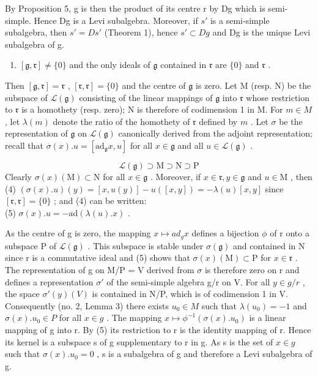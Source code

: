 By Proposition 5, g is then the product of its centre r by Dg which is semi-simple. Hence Dg is a Levi subalgebra. Moreover, if \(s'\) is a semi-simple subalgebra, then \(s' = Ds'\) (Theorem 1), hence \(s' \subset Dg\) and Dg is the unique Levi subalgebra of g.

\begin{enumerate}
\def\labelenumi{(\alph{enumi})}
\setcounter{enumi}{1}
\tightlist
\item
  \([\mathfrak{g},\mathfrak{r}]\neq \{0\}\) and the only ideals of \(\mathfrak{g}\) contained in \(\mathfrak{r}\) are \(\{0\}\) and \(\mathfrak{r}\) .
\end{enumerate}

Then \([\mathfrak{g},\mathfrak{r}] = \mathfrak{r}\) , \([\mathfrak{r},\mathfrak{r}] = \{0\}\) and the centre of \(\mathfrak{g}\) is zero. Let M (resp. N) be the subspace of \(\mathcal{L}(\mathfrak{g})\) consisting of the linear mappings of \(\mathfrak{g}\) into \(\mathfrak{r}\) whose restriction to \(\mathfrak{r}\) is a homothety (resp. zero); N is therefore of codimension 1 in M. For \(m\in M\) , let \(\lambda (m)\) denote the ratio of the homothety of \(\mathfrak{r}\) defined by \(m\) . Let \(\sigma\) be the representation of \(\mathfrak{g}\) on \(\mathcal{L}(\mathfrak{g})\) canonically derived from the adjoint representation; recall that \(\sigma (x).u = [\mathrm{ad}_{\mathfrak{g}}x,u]\) for all \(x\in \mathfrak{g}\) and all \(u\in \mathcal{L}(\mathfrak{g})\) .

\[
\mathcal{L}(\mathfrak{g}) \supset \mathrm{M} \supset \mathrm{N} \supset \mathrm{P}
\]
Clearly \(\sigma (x)(\mathrm{M})\subset \mathrm{N}\) for all \(x\in \mathfrak{g}\) . Moreover, if \(x\in \mathfrak{r},y\in \mathfrak{g}\) and \(u\in \mathrm{M}\) , then\\
(4) \((\sigma (x).u)(y) = [x,u(y)] - u([x,y]) = -\lambda (u)[x,y]\) since \([\mathfrak{r},\mathfrak{r}] = \{0\}\) ; and (4) can be written:\\
(5) \(\sigma (x).u = -\mathrm{ad}(\lambda (u).x)\) .

As the centre of g is zero, the mapping \(x \mapsto ad_{g}x\) defines a bijection \(\phi\) of r onto a subspace P of \(\mathcal{L}(\mathfrak{g})\) . This subspace is stable under \(\sigma(\mathfrak{g})\) and contained in N since r is a commutative ideal and (5) shows that \(\sigma(x)(\mathrm{M}) \subset \mathrm{P}\) for \(x \in \mathfrak{r}\) . The representation of g on M/P = V derived from \(\sigma\) is therefore zero on r and defines a representation \(\sigma'\) of the semi-simple algebra g/r on V. For all \(y \in g/r\) , the space \(\sigma'(y)(V)\) is contained in N/P, which is of codimension 1 in V. Consequently (no. 2, Lemma 3) there exists \(u_{0} \in M\) such that \(\lambda(u_{0}) = -1\) and \(\sigma(x).u_{0} \in P\) for all \(x \in g\) . The mapping \(x \mapsto \phi^{-1}(\sigma(x).u_{0})\) is a linear mapping of g into r. By (5) its restriction to r is the identity mapping of r. Hence its kernel is a subspace s of g supplementary to r in g. As s is the set of \(x \in g\) such that \(\sigma(x).u_{0} = 0\) , s is a subalgebra of g and therefore a Levi subalgebra of g.

